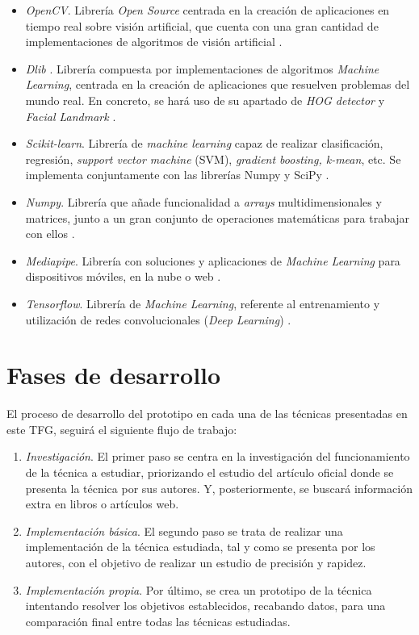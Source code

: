 \begin{itemize}
	\item \textit{OpenCV}. Librería \textit{Open Source} centrada en la creación de aplicaciones en tiempo real sobre visión artificial, que cuenta con una gran cantidad de implementaciones de algoritmos de visión artificial \cite{opencv}.
	\item \textit{Dlib} \cite{dlib}. Librería compuesta por implementaciones de algoritmos \textit{Machine Learning}, centrada en la creación de aplicaciones que resuelven problemas del mundo real. En concreto, se hará uso de su apartado de \textit{HOG detector} \cite{hog} y \textit{Facial Landmark} \cite{faceLandmark}.
	\vspace{-0.3cm}
	\item \textit{Scikit-learn}. Librería de \textit{machine learning} capaz de realizar clasificación, regresión, \textit{support vector machine} (SVM), \textit{gradient boosting, \textit{k-mean}}, etc. Se implementa conjuntamente con las librerías Numpy y SciPy \cite{scikit-learn}.
	\item \textit{Numpy}. Librería que añade funcionalidad a \textit{arrays} multidimensionales y matrices, junto a un gran conjunto de operaciones matemáticas para trabajar con ellos \cite{2020NumPy-Array}.
	\item \textit{Mediapipe}. Librería con soluciones y aplicaciones de \textit{Machine Learning} para dispositivos móviles, en la nube o web \cite{mediapipe}.
	\item \textit{Tensorflow}. Librería de \textit{Machine Learning}, referente al entrenamiento y utilización de redes convolucionales (\textit{Deep Learning}) \cite{tensorflow}.
\end{itemize}

\vspace{-1cm}
\section{Fases de desarrollo}
\vspace{-0.5cm}
El proceso de desarrollo del prototipo en cada una de las técnicas presentadas en este TFG, seguirá el siguiente flujo de trabajo:

\begin{enumerate}
	\item \textit{Investigación}. El primer paso se centra en la investigación del funcionamiento de la técnica a estudiar, priorizando el estudio del artículo oficial donde se presenta la técnica por sus autores. Y, posteriormente, se buscará información extra en libros o artículos web.
	\item \textit{Implementación básica}. El segundo paso se trata de realizar una implementación de la técnica estudiada, tal y como se presenta por los autores, con el objetivo de realizar un estudio de precisión y rapidez.
	\item \textit{Implementación propia}. Por último, se crea un prototipo de la técnica intentando resolver los objetivos establecidos, recabando datos, para una comparación final entre todas las técnicas estudiadas.
\end{enumerate}

